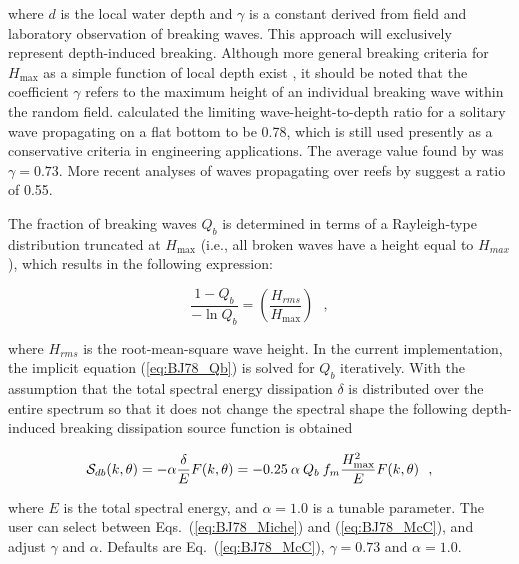 \noindent
where $d$ is the local water depth and $\gamma$ is a constant derived from
field and laboratory observation of breaking waves. This approach will
exclusively represent depth-induced breaking.  Although more general breaking
criteria for $H_{\max}$ as a simple function of local depth exist
\citep[e.g.,][]{art:TG83}, it should be noted that the coefficient $\gamma$
refers to the maximum height of an individual breaking wave within the random
field. \cite{art:M1894} calculated the limiting wave-height-to-depth ratio for
a solitary wave propagating on a flat bottom to be 0.78, which is still used
presently as a conservative criteria in engineering applications. The average
value found by \cite{pro:BJ78} was $\gamma = 0.73$. More recent analyses of
waves propagating over reefs by \cite{art:Nel94, art:Nel97} suggest a ratio of
0.55.

The fraction of breaking waves $Q_b$ is determined in terms of a Rayleigh-type
distribution truncated at $H_{\max}$ (i.e., all broken waves have a height
equal to $H_{max}$), which results in the following expression:


\begin{equation}
\frac{1 - Q_b}{-\ln Q_b} = \left ( \frac{H_{rms}}{H_{\max}} \right )
\:\:\: , \label{eq:BJ78_Qb}
\end{equation}

\noindent
where $H_{rms}$ is the root-mean-square wave height. In the current
implementation, the implicit equation (\ref{eq:BJ78_Qb}) is solved for $Q_b$
iteratively. With the assumption that the total spectral energy dissipation
$\delta$ is distributed over the entire spectrum so that it does not change
the spectral shape \citep{art:EB96} the following depth-induced breaking
dissipation source function is obtained


\begin{equation}
{\cal S}_{db} (k,\theta) = - \alpha \frac{\delta}{E} F(k,\theta)
       = - 0.25 \: \alpha \: Q_b \: f_m \frac{H_{\max}^2}{E} F(k,\theta)
\:\:\: , \label{eq:BJ78}
\end{equation}

\noindent
where $E$ is the total spectral energy, and $\alpha = 1.0$ is a tunable
parameter. The user can select between Eqs.~(\ref{eq:BJ78_Miche}) and
(\ref{eq:BJ78_McC}), and adjust $\gamma$ and $\alpha$. Defaults are
Eq.~(\ref{eq:BJ78_McC}), $\gamma = 0.73$ and $\alpha = 1.0$.


\vsssub
